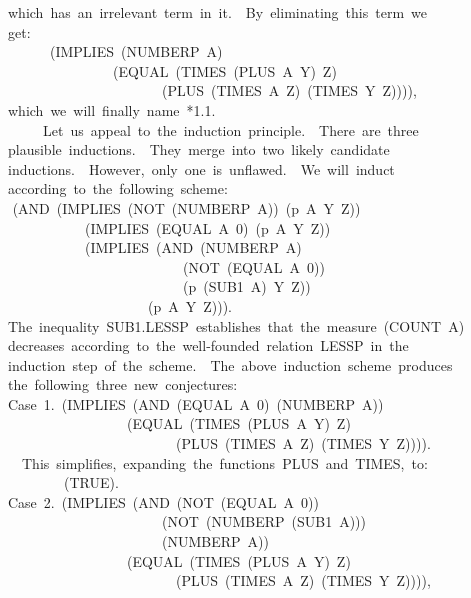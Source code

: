 \documentclass[10pt]{book}
\newenvironment{pubasis}{\begin{flushleft}}{\end{flushleft}}
\begin{document}
\begin{pubasis}
~~which~has~an~irrelevant~term~in~it.~~By~eliminating~this~term~we\\
~~get:\\

~~~~~~~~(IMPLIES~(NUMBERP~A)\\
~~~~~~~~~~~~~~~~~(EQUAL~(TIMES~(PLUS~A~Y)~Z)\\
~~~~~~~~~~~~~~~~~~~~~~~~(PLUS~(TIMES~A~Z)~(TIMES~Y~Z)))),\\

~~which~we~will~finally~name~*1.1.\\

~~~~~~~Let~us~appeal~to~the~induction~principle.~~There~are~three\\
~~plausible~inductions.~~They~merge~into~two~likely~candidate\\
~~inductions.~~However,~only~one~is~unflawed.~~We~will~induct\\
~~according~to~the~following~scheme:\\
~~	(AND~(IMPLIES~(NOT~(NUMBERP~A))~(p~A~Y~Z))\\
~~~~~~~~~~~~~(IMPLIES~(EQUAL~A~0)~(p~A~Y~Z))\\
~~~~~~~~~~~~~(IMPLIES~(AND~(NUMBERP~A)\\
~~~~~~~~~~~~~~~~~~~~~~~~~~~(NOT~(EQUAL~A~0))\\
~~~~~~~~~~~~~~~~~~~~~~~~~~~(p~(SUB1~A)~Y~Z))\\
~~~~~~~~~~~~~~~~~~~~~~(p~A~Y~Z))).\\
~~The~inequality~SUB1.LESSP~establishes~that~the~measure~(COUNT~A)\\
~~decreases~according~to~the~well-founded~relation~LESSP~in~the\\
~~induction~step~of~the~scheme.~~The~above~induction~scheme~produces\\
~~the~following~three~new~conjectures:\\

~~Case~1.~(IMPLIES~(AND~(EQUAL~A~0)~(NUMBERP~A))\\
~~~~~~~~~~~~~~~~~~~(EQUAL~(TIMES~(PLUS~A~Y)~Z)\\
~~~~~~~~~~~~~~~~~~~~~~~~~~(PLUS~(TIMES~A~Z)~(TIMES~Y~Z)))).\\

~~~~This~simplifies,~expanding~the~functions~PLUS~and~TIMES,~to:\\

~~~~~~~~~~(TRUE).\\

~~Case~2.~(IMPLIES~(AND~(NOT~(EQUAL~A~0))\\
~~~~~~~~~~~~~~~~~~~~~~~~(NOT~(NUMBERP~(SUB1~A)))\\
~~~~~~~~~~~~~~~~~~~~~~~~(NUMBERP~A))\\
~~~~~~~~~~~~~~~~~~~(EQUAL~(TIMES~(PLUS~A~Y)~Z)\\
~~~~~~~~~~~~~~~~~~~~~~~~~~(PLUS~(TIMES~A~Z)~(TIMES~Y~Z)))),\\


\end{pubasis}
\end{document}

